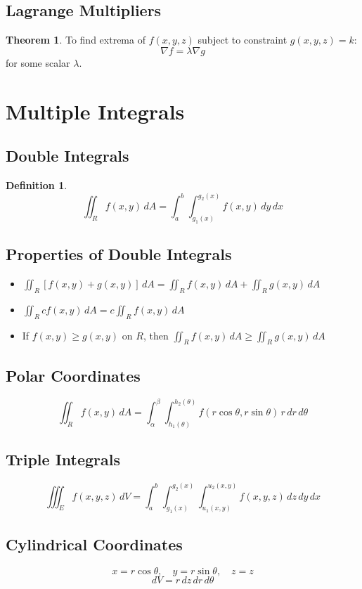 \documentclass[11pt]{article}
\theoremstyle{definition}
\newtheorem{definition}{Definition}[section]
\newtheorem{theorem}{Theorem}[section]
\begin{document}
\subsection{Lagrange Multipliers}
\begin{theorem}
To find extrema of $f(x,y,z)$ subject to constraint $g(x,y,z) = k$:
$$\nabla f = \lambda \nabla g$$
for some scalar $\lambda$.
\end{theorem}

\section{Multiple Integrals}

\subsection{Double Integrals}
\begin{definition}
$$\iint_R f(x,y) \, dA = \int_a^b \int_{g_1(x)}^{g_2(x)} f(x,y) \, dy \, dx$$
\end{definition}

\subsection{Properties of Double Integrals}
\begin{itemize}
    \item $\iint_R [f(x,y) + g(x,y)] \, dA = \iint_R f(x,y) \, dA + \iint_R g(x,y) \, dA$
    \item $\iint_R cf(x,y) \, dA = c\iint_R f(x,y) \, dA$
    \item If $f(x,y) \geq g(x,y)$ on $R$, then $\iint_R f(x,y) \, dA \geq \iint_R g(x,y) \, dA$
\end{itemize}

\subsection{Polar Coordinates}
$$\iint_R f(x,y) \, dA = \int_\alpha^\beta \int_{h_1(\theta)}^{h_2(\theta)} f(r\cos\theta, r\sin\theta) \, r \, dr \, d\theta$$

\subsection{Triple Integrals}
$$\iiint_E f(x,y,z) \, dV = \int_a^b \int_{g_1(x)}^{g_2(x)} \int_{u_1(x,y)}^{u_2(x,y)} f(x,y,z) \, dz \, dy \, dx$$

\subsection{Cylindrical Coordinates}
$$x = r\cos\theta, \quad y = r\sin\theta, \quad z = z$$
$$dV = r \, dz \, dr \, d\theta$$
\end{document}
